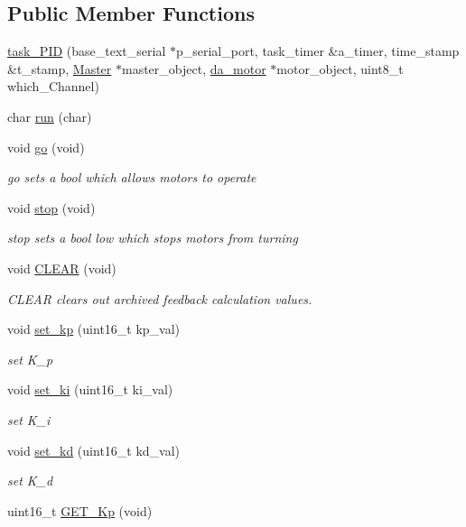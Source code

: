 \subsection*{Public Member Functions}
\begin{DoxyCompactItemize}
\item 
\hyperlink{classtask___p_i_d_a2e6f07f6c2d77478c31098a329c0e145}{task\-\_\-\-P\-I\-D} (base\-\_\-text\-\_\-serial $\ast$p\-\_\-serial\-\_\-port, task\-\_\-timer \&a\-\_\-timer, time\-\_\-stamp \&t\-\_\-stamp, \hyperlink{class_master}{Master} $\ast$master\-\_\-object, \hyperlink{classda__motor}{da\-\_\-motor} $\ast$motor\-\_\-object, uint8\-\_\-t which\-\_\-\-Channel)
\item 
char \hyperlink{classtask___p_i_d_a6f05dcd8d4efe5ab56610e02ea814b7b}{run} (char)
\item 
void \hyperlink{classtask___p_i_d_af5c32248046e469d4a7d84bf5edef147}{go} (void)
\begin{DoxyCompactList}\small\item\em go sets a bool which allows motors to operate \end{DoxyCompactList}\item 
void \hyperlink{classtask___p_i_d_af0a7b8ea266e97a883b58a8efc7812e4}{stop} (void)
\begin{DoxyCompactList}\small\item\em stop sets a bool low which stops motors from turning \end{DoxyCompactList}\item 
void \hyperlink{classtask___p_i_d_a39f37fa8c4514697bc6fe25fc6bd3498}{C\-L\-E\-A\-R} (void)
\begin{DoxyCompactList}\small\item\em C\-L\-E\-A\-R clears out archived feedback calculation values. \end{DoxyCompactList}\item 
void \hyperlink{classtask___p_i_d_a42c0117a576e25c264e2d62c6224ba6f}{set\-\_\-kp} (uint16\-\_\-t kp\-\_\-val)
\begin{DoxyCompactList}\small\item\em set K\-\_\-p \end{DoxyCompactList}\item 
void \hyperlink{classtask___p_i_d_a6b61639ae796073f60e452a19a692e4e}{set\-\_\-ki} (uint16\-\_\-t ki\-\_\-val)
\begin{DoxyCompactList}\small\item\em set K\-\_\-i \end{DoxyCompactList}\item 
void \hyperlink{classtask___p_i_d_ab086212c737d28bfa3af6f423eb4c54a}{set\-\_\-kd} (uint16\-\_\-t kd\-\_\-val)
\begin{DoxyCompactList}\small\item\em set K\-\_\-d \end{DoxyCompactList}\item 
\hypertarget{classtask___p_i_d_ae4dbe31628ed6557e7703494006744e4}{uint16\-\_\-t \hyperlink{classtask___p_i_d_ae4dbe31628ed6557e7703494006744e4}{G\-E\-T\-\_\-\-Kp} (void)}\label{classtask___p_i_d_ae4dbe31628ed6557e7703494006744e4}


\end{DoxyCompactItemize}
